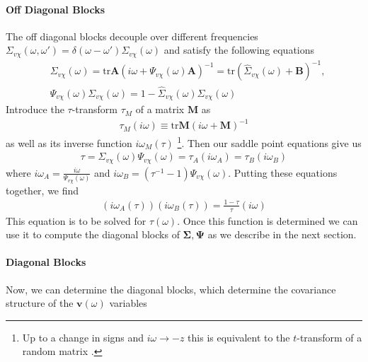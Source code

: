 \documentclass{article} %
\def\v{\bm v}
\begin{document}
\paragraph{Off Diagonal Blocks} The off diagonal blocks decouple over different frequencies $\Sigma_{v\chi}(\omega,\omega') = \delta(\omega-\omega') \Sigma_{v\chi}(\omega)$ and satisfy the following equations
\begin{align}
    &\Sigma_{v\chi}(\omega) = \text{tr} \bm A \left( i \omega + \Psi_{v\chi}(\omega) \bm A \right)^{-1} = \text{tr}\left( \hat{\Sigma}_{v\chi}(\omega) + \bm B \right)^{-1} ,
    \\
    &\Psi_{v\chi}(\omega) \Sigma_{v\chi}(\omega) = 1 - \hat\Sigma_{v\chi}(\omega) \Sigma_{v\chi}(\omega)
\end{align}
Introduce the $\tau$-transform $\tau_{M}$ of a matrix $\bm M$ as
\begin{align}
    \tau_M(i\omega) \equiv \text{tr} \bm M( i\omega + \bm M)^{-1} 
\end{align}
as well as its inverse function $i\omega_M(\tau)$ \footnote{Up to a change in signs and $i\omega \to -z$ this is equivalent to the $t$-transform of a random matrix \citep{potters2020first}.}.  Then our saddle point equations give us
\begin{align}
    \tau = \Sigma_{v\chi}(\omega) \Psi_{v\chi}(\omega) = \tau_A( i\omega_A) = \tau_B(i \omega_B) 
\end{align}
where $i\omega_A = \frac{i\omega}{\Psi_{v\chi}(\omega)}$ and $i \omega_B = ( \tau^{-1} - 1 )\Psi_{v\chi}(\omega)$. Putting these equations together, we find
\begin{align}
    (i\omega_A(\tau)) (i\omega_B(\tau)) = \frac{1-\tau}{\tau}  ( i \omega ) 
\end{align}
This equation is to be solved for $\tau(\omega)$. Once this function is determined we can use it to compute the diagonal blocks of $\bm\Sigma,\bm\Psi$ as we describe in the next section. 

\paragraph{Diagonal Blocks} Now, we can determine the diagonal blocks, which determine the covariance structure of the $\v(\omega)$ variables
\end{document}
